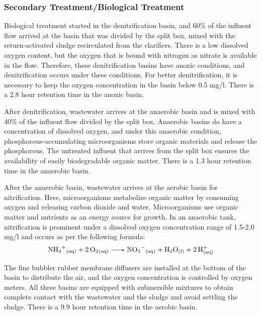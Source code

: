 \subsubsection{Secondary Treatment/Biological Treatment}
Biological treatment started in the denitrification basin, and 60\% of the influent flow arrived at the basin that was divided by the split box, mixed with the return-activated sludge recirculated from the clarifiers. There is a low dissolved oxygen content, but the oxygen that is bound with nitrogen as nitrate is available in the flow. Therefore, these denitrification basins have anoxic conditions, and denitrification occurs under these conditions. For better denitrification, it is necessary to keep the oxygen concentration in the basin below 0.5 \unit{mg/l}. There is a 2.8 \unit{hour} retention time in the anoxic basin. 

After denitrification, wastewater arrives at the anaerobic basin and is mixed with 40\% of the influent flow divided by the split box. Anaerobic basins do have a concentration of dissolved oxygen, and under this anaerobic condition, phosphorous-accumulating microorganisms store organic materials and release the phosphorous. The untreated influent that arrives from the split box ensures the availability of easily biodegradable organic matter. There is a 1.3 \unit{hour} retention time in the anaerobic basin.

After the anaerobic basin, wastewater arrives at the aerobic basin for nitrification. Here, microorganisms metabolize organic matter by consuming oxygen and releasing carbon dioxide and water. Microorganisms use organic matter and nutrients as an energy source for growth. In an anaerobic tank, nitrification is prominent under a dissolved oxygen concentration range of 1.5-2.0 \unit{mg/l} and occurs as per the following formula:
\begin{gather}
    \ce{NH4^+_{(aq)} + 2 O2_{(aq)} -> NO3^-_{(aq)}  + H2O_{(l)}  + 2 H^+_{(aq)}}
\end{gather}

The fine bubbler rubber membrane diffusers are installed at the bottom of the basin to distribute the air, and the oxygen concentration is controlled by oxygen meters. All three basins are equipped with submersible mixtures to obtain complete contact with the wastewater and the sludge and avoid settling the sludge. There is a 9.9 \unit{hour} retention time in the aerobic basin.


